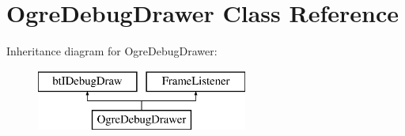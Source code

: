\hypertarget{class_ogre_debug_drawer}{\section{Ogre\-Debug\-Drawer Class Reference}
\label{class_ogre_debug_drawer}
}
Inheritance diagram for Ogre\-Debug\-Drawer\-:\begin{figure}[H]
\begin{center}
\leavevmode
\includegraphics[height=2.000000cm]{class_ogre_debug_drawer}
\end{center}
\end{figure}
